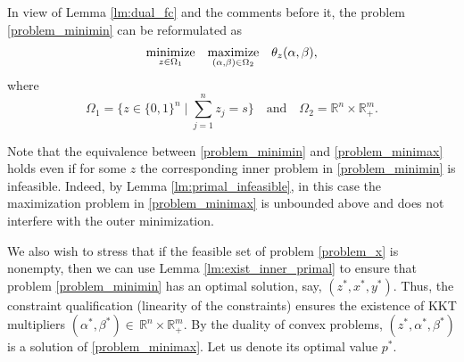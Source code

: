 \documentclass[smallextended,referee,envcountsect]{svjour3}
\newcommand{\R}{\mathbb{R}}
\begin{document}
In view of Lemma \ref{lm:dual_fc} and the comments before it, the 
problem \eqref{problem_minimin} can be reformulated as 
\begin{equation}
\label{problem_minimax}\begin{array}{ccl}
\displaystyle\mathop{\rm minimize}_{z\in\Omega_1} & 
\displaystyle\mathop{\rm maximize}_{(\alpha,\beta)\in\Omega_2} & 
\theta_z(\alpha,\beta),
\end{array}
\end{equation}
where 
$$
\Omega_1 = \bigg\{z\in\{0,1\}^n\mid\textstyle
\sum\limits_{j=1}^{n}z_j=s\bigg\}\quad\mbox{and}\quad
\Omega_2 = \R^n\times\R_+^m.
$$

Note that the equivalence between \eqref{problem_minimin} and \eqref{problem_minimax} 
holds even if for some $z$ the corresponding inner problem in \eqref{problem_minimin} 
is infeasible. Indeed, by Lemma \ref{lm:primal_infeasible}, in this case the maximization 
problem in \eqref{problem_minimax} is unbounded above and does not interfere with the 
outer minimization.

\begin{remark}
\label{rm:existence_minmin}
We also wish to stress that if the feasible set of problem \eqref{problem_x} is 
nonempty, then we can use Lemma \ref{lm:exist_inner_primal} to ensure that 
problem \eqref{problem_minimin} has an optimal solution, say, $(z^*,x^*,y^*)$. Thus, the 
constraint qualification (linearity of the constraints) ensures the existence of KKT 
multipliers $(\alpha^*,\beta^*)\in\,\R^n\times\R_+^m$. By the duality of convex problems, 
$(z^*,\alpha^*,\beta^*)$ is a solution of \eqref{problem_minimax}. Let us denote its 
optimal value $p^*$.
\end{remark}
\end{document}
